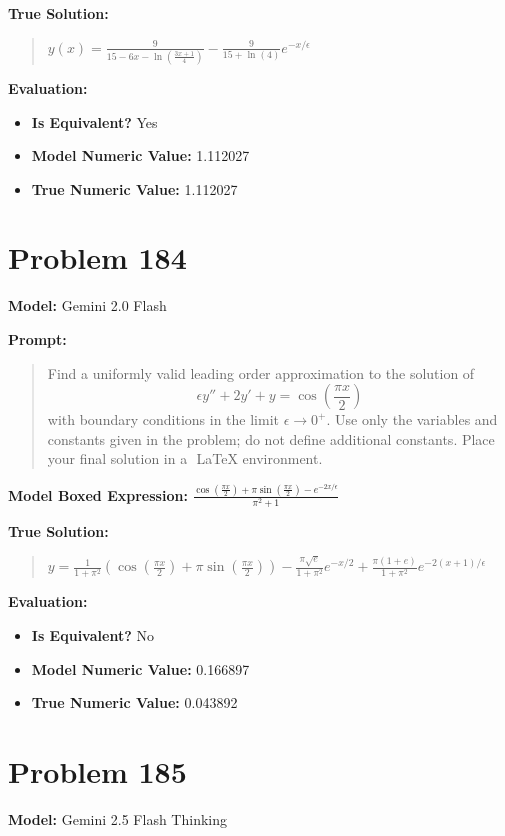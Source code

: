 \documentclass{article}
\begin{document}
{\textbf{True Solution:}
\begin{quote}
$y(x)=\frac{9}{15-6x-\ln(\frac{3x+1}{4})}-\frac{9}{15+\ln(4)}e^{-x/\epsilon}$
\end{quote}

\textbf{Evaluation:}
\begin{itemize}
\item \textbf{Is Equivalent?} Yes
\item \textbf{Model Numeric Value:} 1.112027
\item \textbf{True Numeric Value:} 1.112027
\end{itemize}
\vspace{1cm}
\section*{Problem 184}
\textbf{Model:} Gemini 2.0 Flash

\textbf{Prompt:}
\begin{quote}
Find a uniformly valid leading order approximation to the solution of $$ \epsilon y'' + 2y' + y = \cos\left(\frac{\pi x}{2}\right)$$ with boundary conditions in the limit $\epsilon \to 0^+$. Use only the variables and constants given in the problem; do not define additional constants. Place your final solution in a $\boxed{}$ LaTeX environment.
\end{quote}
\textbf{Model Boxed Expression:} $\frac{\cos\left(\frac{\pi x}{2}\right) + \pi\sin\left(\frac{\pi x}{2}\right) - e^{-2x/\epsilon}}{\pi^2+1}$

\textbf{True Solution:}
\begin{quote}
$y = \frac{1}{1+\pi^2}\left(\cos\left(\frac{\pi x}{2}\right)+\pi\sin\left(\frac{\pi x}{2}\right)\right) - \frac{\pi \sqrt{e}}{1+\pi^2} e^{-x/2} + \frac{\pi(1+e)}{1+\pi^2} e^{-2(x+1)/\epsilon}$
\end{quote}

\textbf{Evaluation:}
\begin{itemize}
\item \textbf{Is Equivalent?} No
\item \textbf{Model Numeric Value:} 0.166897
\item \textbf{True Numeric Value:} 0.043892
\end{itemize}
\vspace{1cm}
\section*{Problem 185}
\textbf{Model:} Gemini 2.5 Flash Thinking

}
\end{document}
